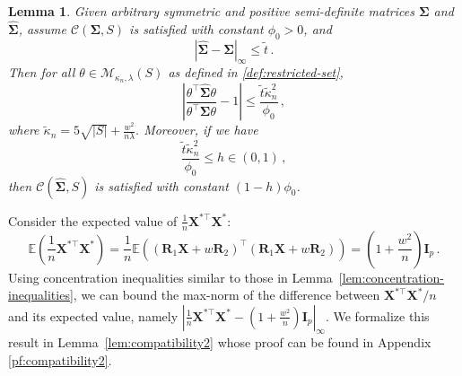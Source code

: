 \documentclass[11pt]{article}
\newtheorem{lemma}{Lemma}%
\renewcommand{\hat}{\widehat}
\newcommand{\bX}{\boldsymbol{X}}
\newcommand{\bI}{\boldsymbol{I}}
\newcommand{\bR}{\boldsymbol{R}}
\newcommand{\bSigma}{\boldsymbol{\Sigma}}
\newcommand{\Expected}{\mathbb{E}}
\begin{document}
\begin{lemma}\label{lem:compatibility1}
    Given arbitrary symmetric and positive semi-definite matrices $\bSigma$ and $\hat{\bSigma}$,  assume $\mathcal{C}(\bSigma,S)$ is satisfied with constant $\phi_0>0$, and
    \begin{equation*}
        \left|\hat{\bSigma}-\bSigma\right|_\infty\leq \tilde{t}\,.
    \end{equation*}
    Then for all $\theta\in\mathcal{M}_{\kappa_n,\lambda}(S)$ as defined in \eqref{def:restricted-set},
    \begin{equation*}
        \left|\frac{\theta^\top \hat{\bSigma}\theta}{\theta^\top \bSigma\theta}-1\right|\leq \frac{\tilde{t}\tilde{\kappa}_n^2}{\phi_0}\,,
    \end{equation*}
    where $\tilde{\kappa}_n=5\sqrt{|S|}+\frac{w^2}{n\lambda}$. Moreover, if we have 
    \begin{equation*}
        \frac{\tilde{t}\tilde{\kappa}_n^2}{\phi_0}\leq h\in (0,1)\,,
    \end{equation*}
    then $\mathcal{C}\left(\hat{\bSigma},S\right)$ is satisfied with constant $(1-h)\phi_0$.
\end{lemma}
Consider the expected value of $\frac{1}{n}\bX^{*\top}\bX^*$:
\[
\Expected\left(\frac{1}{n}\bX^{*\top}\bX^*\right)=\frac{1}{n}\Expected((\bR_1\bX+w\bR_2)^\top(\bR_1\bX+w\bR_2))=\left(1+\frac{w^2}{n}\right)\bI_p\,.
\]
Using concentration inequalities similar to those in Lemma~\ref{lem:concentration-inequalities}, we can bound the max-norm of the difference between $\bX^{*\top}\bX^*/n$ and its expected value, namely $|\frac{1}{n}\bX^{*\top}\bX^*-\left(1+\frac{w^2}{n}\right)\bI_p|_\infty$. We formalize this result in Lemma~\ref{lem:compatibility2} whose proof can be found in Appendix \ref{pf:compatibility2}.
\end{document}
